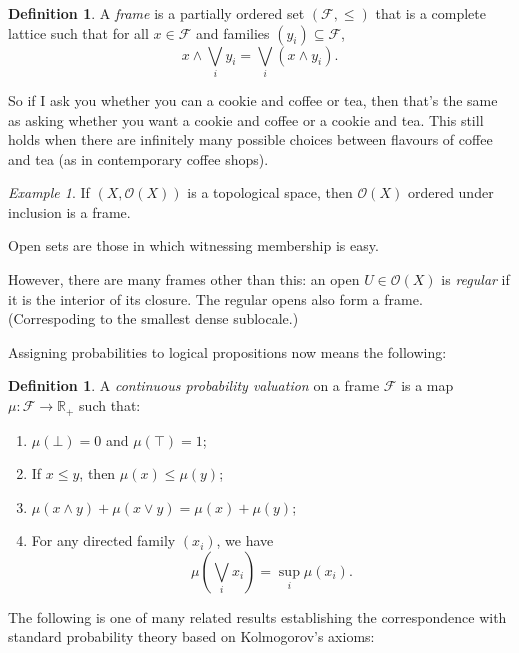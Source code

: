 \documentclass[11pt, oneside, article]{memoir}
\theoremstyle{plain}
\theoremstyle{definition}
\newtheorem{definition}[theorem]{Definition}
\theoremstyle{remark}
\newtheorem{example}[theorem]{Example}
\begin{document}
\newcommand{\Frame}{\mathcal{F}}

\begin{definition}
A \emph{frame} is a partially ordered set $(\Frame,\leq)$ that is a complete lattice such that for all $x \in \Frame$ and families $(y_i) \subseteq \Frame$,
\[
	x \land \bigvee_{i} y_i = \bigvee_{i} (x \land y_i).
\]
\end{definition}

So if I ask you whether you can a cookie and coffee or tea, then that's the same as asking whether you want a cookie and coffee or a cookie and tea. This still holds when there are infinitely many possible choices between flavours of coffee and tea (as in contemporary coffee shops).

\newcommand{\Open}[1]{\mathcal{O}(#1)}

\begin{example}
If $(X,\Open{X})$ is a topological space, then $\Open{X}$ ordered under inclusion is a frame.
\end{example}

Open sets are those in which witnessing membership is easy.

However, there are many frames other than this: an open $U\in\Open{X}$ is \emph{regular} if it is the interior of its closure. The regular opens also form a frame. (Correspoding to the smallest dense sublocale.)

Assigning probabilities to logical propositions now means the following:

\newcommand{\R}{\mathbb{R}}

\begin{definition}
A \emph{continuous probability valuation} on a frame $\Frame$ is a map $\mu : \Frame \to \R_+$ such that:
\begin{enumerate}
\item $\mu(\bot) = 0$ and $\mu(\top) = 1$;
\item If $x\leq y$, then $\mu(x) \leq \mu(y)$;
\item $\mu(x \land y) + \mu(x \lor y) = \mu(x) + \mu(y)$;
\item For any directed family $(x_i)$, we have
\[
	\mu\left( \bigvee_i x_i \right) = \sup_i \mu(x_i).
\]
\end{enumerate}
\end{definition}

The following is one of many related results establishing the correspondence with standard probability theory based on Kolmogorov's axioms:
\end{document}
